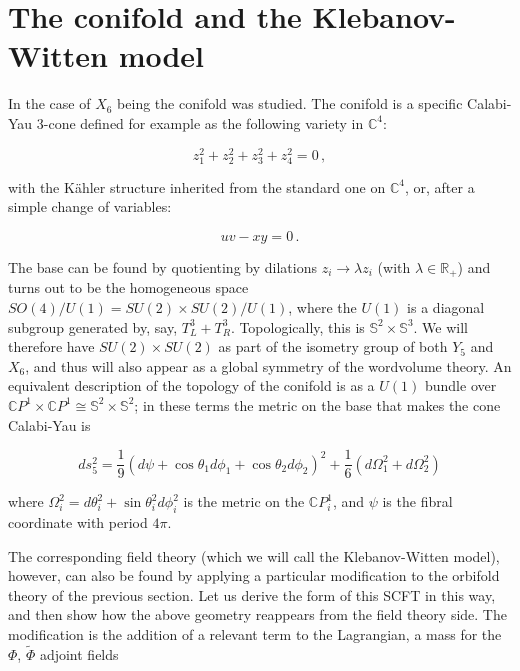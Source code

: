 \section{The conifold and the Klebanov-Witten model} \label{sec:KW}

In \cite{KW_SCFT} the case of $X_6$ being the conifold was studied. The conifold is a specific Calabi-Yau 3-cone defined for example as the following variety in $\mathbb{C}^4$:

\begin{equation}
	z_1^2 + z_2^2 + z_3^2 + z_4^2 = 0\,,
\end{equation}

with the K\"ahler structure inherited from the standard one on $\mathbb{C}^4$, or, after a simple change of variables:

\begin{equation}
	u v - xy = 0\,.
	\label{}
\end{equation}

The base can be found by quotienting by dilations $z_i \rightarrow \lambda z_i$ (with $\lambda \in \mathbb{R}_+$) and turns out to be the homogeneous space $SO(4)/U(1) = SU(2)\times SU(2) / U(1)$, where the $U(1)$ is a diagonal subgroup generated by, say, $T^3_L + T^3_R$. Topologically, this is $\mathbb{S}^2 \times \mathbb{S}^3$. We will therefore have $SU(2)\times SU(2)$ as part of the isometry group of both $Y_5$ and $X_6$, and thus will also appear as a global symmetry of the wordvolume theory. An equivalent description of the topology of the conifold is as a $U(1)$ bundle over $\mathbb{C}P^1 \times \mathbb{C}P^1 \cong \mathbb{S}^2 \times \mathbb{S}^2$; in these terms the metric on the base that makes the cone Calabi-Yau is

\begin{equation}
	ds^2_5 = \frac{1}{9} (d\psi + \cos\theta_1 d\phi_1 + \cos\theta_2 d\phi_2)^2 + \frac{1}{6} (d\Omega_1^2 + d\Omega_2^2)
\end{equation}

where $\Omega_i^2 = d\theta_i^2 + \sin\theta_i^2 d\phi_i^2$ is the metric on the $\mathbb{C}P^1_i$, and $\psi$ is the fibral coordinate with period $4\pi$.

The corresponding field theory (which we will call the Klebanov-Witten model), however, can also be found by applying a particular modification to the orbifold theory of the previous section\cite{KW_SCFT}. Let us derive the form of this SCFT in this way, and then show how the above geometry reappears from the field theory side. The modification is the addition of a relevant term to the Lagrangian, a mass for the $\Phi$, $\tilde\Phi$ adjoint fields

